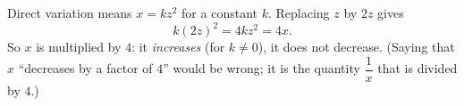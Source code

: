 Direct variation means $x=kz^2$ for a constant $k$. Replacing $z$ by $2z$ gives
\[
k(2z)^2=4kz^2=4x .
\]
So $x$ is multiplied by $\boxed{4}$: it \emph{increases} (for $k\ne0$), it does not decrease. (Saying that $x$ ``decreases by a factor of $4$'' would be wrong; it is the quantity $\dfrac{1}{x}$ that is divided by $4$.)
